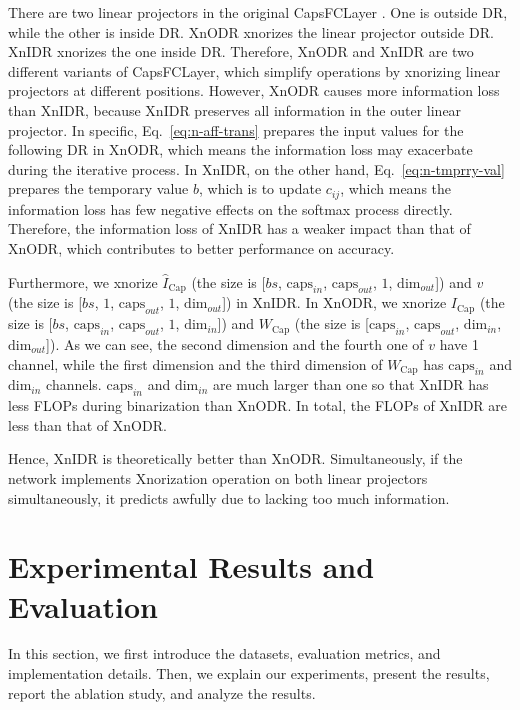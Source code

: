 \documentclass[sn-mathphys,iicol,Numbered]{sn-jnl}
\begin{document}
There are two linear projectors in the original CapsFCLayer \citep{A1_caps}. One is outside DR, while the other is inside DR. XnODR xnorizes the linear projector outside DR. XnIDR xnorizes the one inside DR. Therefore, XnODR and XnIDR are two different variants of CapsFCLayer, which simplify operations by xnorizing linear projectors at different positions. However, XnODR causes more information loss than XnIDR, because XnIDR preserves all information in the outer linear projector. In specific, Eq.~\ref{eq:n-aff-trans} prepares the input values for the following DR in XnODR, which means the information loss may exacerbate during the iterative process. In XnIDR, on the other hand, Eq.~\ref{eq:n-tmprry-val} prepares the temporary value $b$, which is to update $c_{ij}$, which means the information loss has few negative effects on the softmax process directly. Therefore, the information loss of XnIDR has a weaker impact than that of XnODR, which contributes to better performance on accuracy.

Furthermore, we xnorize $\hat{I}_{\text{Cap}}$ (the size is [$bs$, $\text{caps}_{in}$, $\text{caps}_{out}$, $1$, $\text{dim}_{out}$]) and $v$ (the size is [$bs$, $1$, $\text{caps}_{out}$, $1$, $\text{dim}_{out}$]) in XnIDR. In XnODR, we xnorize $I_{\text{Cap}}$ (the size is [$bs$, $\text{caps}_{in}$, $\text{caps}_{out}$, $1$, $\text{dim}_{in}$]) and $W_{\text{Cap}}$ (the size is [$\text{caps}_{in}$, $\text{caps}_{out}$, $\text{dim}_{in}$, $\text{dim}_{out}$]). As we can see, the second dimension and the fourth one of $v$ have 1 channel, while the first dimension and the third dimension of $W_{\text{Cap}}$ has $\text{caps}_{in}$ and $\text{dim}_{in}$ channels. $\text{caps}_{in}$ and $\text{dim}_{in}$ are much larger than one so that XnIDR has less FLOPs during binarization than XnODR. In total, the FLOPs of XnIDR are less than that of XnODR.

Hence, XnIDR is theoretically better than XnODR. Simultaneously, if the network implements Xnorization operation on both linear projectors simultaneously, it predicts awfully due to lacking too much information.

\vspace{-0.2cm}
\section{Experimental Results and Evaluation} \label{sec:4}

In this section, we first introduce the datasets, evaluation metrics, and implementation details. Then, we explain our experiments, present the results, report the ablation study, and analyze the results.
\end{document}
